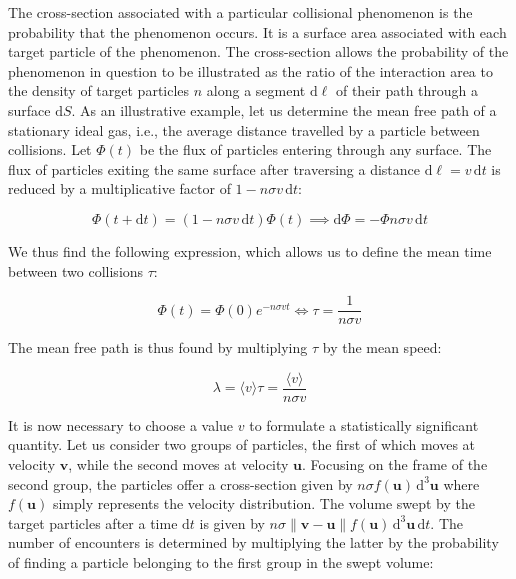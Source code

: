 The cross-section associated with a particular collisional phenomenon is the probability that the phenomenon occurs. It is a surface area associated with each target particle of the phenomenon. The cross-section allows the probability of the phenomenon in question to be illustrated as the ratio of the interaction area to the density of target particles $n$ along a segment $\mathrm{d}\ell$ of their path through a surface $\mathrm{d}S$. As an illustrative example, let us determine the mean free path of a stationary ideal gas, i.e., the average distance travelled by a particle between collisions. Let $\Phi(t)$ be the flux of particles entering through any surface. The flux of particles exiting the same surface after traversing a distance $\mathrm{d}\ell=v\,\mathrm{d}t$ is reduced by a multiplicative factor of $1-n\sigma v\,\mathrm{d}t$:

\begin{equation}
    \Phi(t+\mathrm{d}t)=(1-n\sigma v\,\mathrm{d}t)\Phi(t)\implies\mathrm{d}\Phi=-\Phi n\sigma v\,\mathrm{d}t
\end{equation}

We thus find the following expression, which allows us to define the mean time between two collisions $\tau$:

\begin{equation}
    \label{eq1-37}
    \Phi(t)=\Phi(0)e^{-n\sigma v t}\Longleftrightarrow\tau=\frac{1}{n\sigma v}
\end{equation}

The mean free path is thus found by multiplying $\tau$ by the mean speed:

\begin{equation}
    \lambda=\langle v\rangle\tau=\frac{\langle v\rangle}{n\sigma v}
\end{equation}

It is now necessary to choose a value $v$ to formulate a statistically significant quantity. Let us consider two groups of particles, the first of which moves at velocity $\mathbf{v}$, while the second moves at velocity $\mathbf{u}$. Focusing on the frame of the second group, the particles offer a cross-section given by $n\sigma f(\mathbf{u})\,\mathrm{d}^3\mathbf{u}$ where $f(\mathbf{u})$ simply represents the velocity distribution. The volume swept by the target particles after a time $\mathrm{d}t$ is given by $n\sigma\|\mathbf{v}-\mathbf{u}\|f(\mathbf{u})\,\mathrm{d}^3\mathbf{u}\,\mathrm{d}t$. The number of encounters is determined by multiplying the latter by the probability of finding a particle belonging to the first group in the swept volume:

